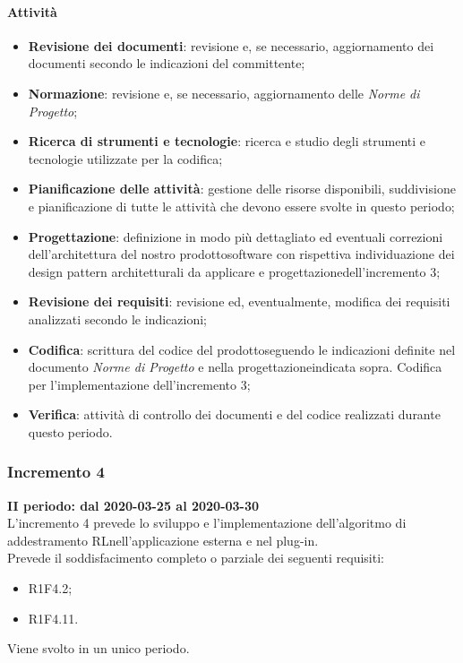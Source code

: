 \paragraph{Attività} 
\begin{itemize}
	\item \textbf{Revisione dei documenti}: revisione e, se necessario, aggiornamento dei documenti secondo le indicazioni del committente;
	\item \textbf{Normazione}: revisione e, se necessario, aggiornamento delle \textit{Norme di Progetto};
	\item \textbf{Ricerca di strumenti e tecnologie}: ricerca e studio degli strumenti e tecnologie utilizzate per la codifica;
	\item \textbf{Pianificazione delle attività}: gestione delle risorse disponibili, suddivisione e pianificazione di tutte le attività che devono essere svolte in questo periodo;
	\item \textbf{Progettazione}\glo: definizione in modo più dettagliato ed eventuali correzioni dell'architettura del nostro prodotto\glosp software con rispettiva individuazione dei design pattern architetturali da applicare e progettazione\glosp dell'incremento 3; 
	\item \textbf{Revisione dei requisiti}: revisione ed, eventualmente, modifica dei requisiti analizzati secondo le indicazioni; 
	\item \textbf{Codifica}: scrittura del codice del prodotto\glosp seguendo le indicazioni definite nel documento \textit{Norme di Progetto} e nella progettazione\glosp indicata sopra. Codifica per l'implementazione dell'incremento 3; 
	\item \textbf{Verifica}: attività di controllo dei documenti e del codice realizzati durante questo periodo.
\end{itemize}
\subsubsection{Incremento 4}
\textbf{II periodo: dal 2020-03-25 al 2020-03-30} \\
L'incremento 4 prevede lo sviluppo e l'implementazione dell'algoritmo di addestramento RL\glosp nell'applicazione esterna e nel plug-in.
\\Prevede il soddisfacimento completo o parziale dei seguenti requisiti:
\begin{itemize}
	\item R1F4.2;
	\item R1F4.11. 
\end{itemize}
Viene svolto in un unico periodo.
